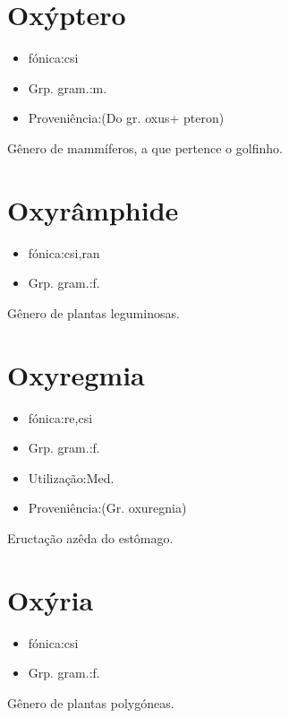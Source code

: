 \section{Oxýptero}
\begin{itemize}
\item {fónica:csi}
\end{itemize}
\begin{itemize}
\item {Grp. gram.:m.}
\end{itemize}
\begin{itemize}
\item {Proveniência:(Do gr. \textunderscore oxus\textunderscore  + \textunderscore pteron\textunderscore )}
\end{itemize}
Gênero de mammíferos, a que pertence o golfinho.
\section{Oxyrâmphide}
\begin{itemize}
\item {fónica:csi,ran}
\end{itemize}
\begin{itemize}
\item {Grp. gram.:f.}
\end{itemize}
Gênero de plantas leguminosas.
\section{Oxyregmia}
\begin{itemize}
\item {fónica:re,csi}
\end{itemize}
\begin{itemize}
\item {Grp. gram.:f.}
\end{itemize}
\begin{itemize}
\item {Utilização:Med.}
\end{itemize}
\begin{itemize}
\item {Proveniência:(Gr. \textunderscore oxuregnia\textunderscore )}
\end{itemize}
Eructação azêda do estômago.
\section{Oxýria}
\begin{itemize}
\item {fónica:csi}
\end{itemize}
\begin{itemize}
\item {Grp. gram.:f.}
\end{itemize}
Gênero de plantas polygóneas.

